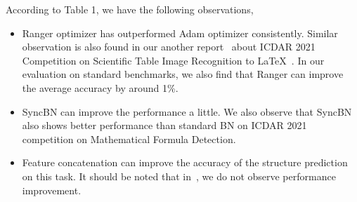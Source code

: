 \documentclass{article}
\begin{document}
According to Table 1, we have the following observations,
\begin{itemize}[leftmargin=.1in]
  \item Ranger optimizer has outperformed Adam optimizer consistently. Similar observation is also found in our another report~\cite{he2021ICDAR} about ICDAR 2021 Competition on Scientific Table Image Recognition to LaTeX~\cite{Pratik2021ICDAR}. In our evaluation on standard benchmarks, we also find that Ranger can improve the average accuracy by around 1\%. 
  \item SyncBN can improve the performance a little. We also observe that SyncBN also shows better performance than standard BN on ICDAR 2021 competition on Mathematical Formula Detection.
  \item Feature concatenation can improve the accuracy of the structure prediction on this task. It should be noted that in~\cite{he2021ICDAR}, we do not observe performance improvement.
\end{itemize}
\end{document}
